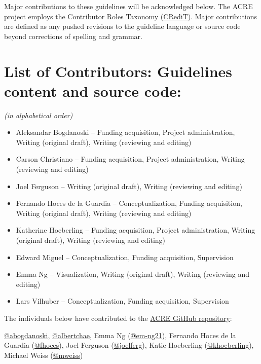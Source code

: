 \documentclass[]{book}
\providecommand{\tightlist}{%
  \setlength{\itemsep}{0pt}\setlength{\parskip}{0pt}}
\begin{document}
Major contributions to these guidelines will be acknowledged below. The ACRE project employs the Contributor Roles Taxonomy (\href{https://casrai.org/credit/}{CRediT}). Major contributions are defined as any pushed revisions to the guideline language or source code beyond corrections of spelling and grammar.

\hypertarget{list-of-contributors-guidelines-content-and-source-code}{%
\section{List of Contributors: Guidelines content and source code:}\label{list-of-contributors-guidelines-content-and-source-code}}

\emph{(in alphabetical order)}

\begin{itemize}
\tightlist
\item
  Aleksandar Bogdanoski -- Funding acquisition, Project administration, Writing (original draft), Writing (reviewing and editing)
\item
  Carson Christiano -- Funding acquisition, Project administration, Writing (reviewing and editing)
\item
  Joel Ferguson -- Writing (original draft), Writing (reviewing and editing)
\item
  Fernando Hoces de la Guardia -- Conceptualization, Funding acquisition, Writing (original draft), Writing (reviewing and editing)
\item
  Katherine Hoeberling -- Funding acquisition, Project administration, Writing (original draft), Writing (reviewing and editing)
\item
  Edward Miguel -- Conceptualization, Funding acquisition, Supervision
\item
  Emma Ng -- Visualization, Writing (original draft), Writing (reviewing and editing)
\item
  Lars Vilhuber -- Conceptualization, Funding acquisition, Supervision
\end{itemize}

The individuals below have contributed to the \href{https://github.com/BITSS/ACRE}{ACRE GitHub repository}:

\href{https://github.com/abogdanoski}{@abogdanoski}, \href{https://github.com/albertchae}{@albertchae}, Emma Ng (\href{https://github.com/em-ng21}{@em-ng21}), Fernando Hoces de la Guardia (\href{https://github.com/fhoces}{@fhoces}), Joel Ferguson (\href{https://github.com/joelferg}{@joelferg}), Katie Hoeberling (\href{https://github.com/khoeberling}{@khoeberling}), Michael Weiss (\href{https://github.com/mweiss}{@mweiss})
\end{document}

